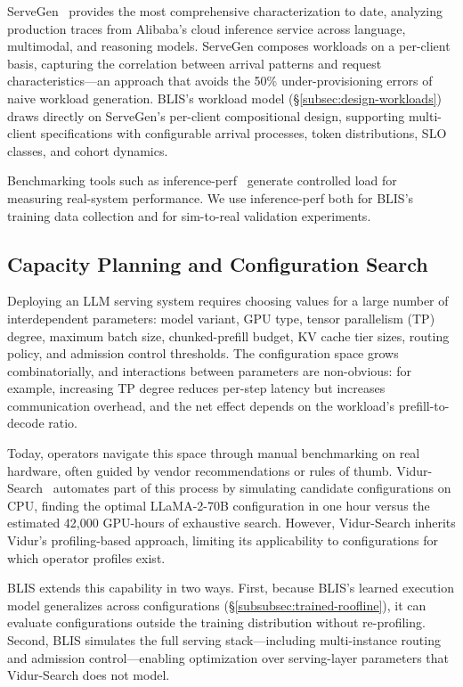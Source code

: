 \documentclass[11pt]{article}
\theoremstyle{plain} %
\theoremstyle{definition} %
\theoremstyle{remark} %
\numberwithin{equation}{section}
\begin{document}
ServeGen~\cite{xiang2025servegen} provides the most comprehensive characterization to date, analyzing production traces from Alibaba's cloud inference service across language, multimodal, and reasoning models.
ServeGen composes workloads on a per-client basis, capturing the correlation between arrival patterns and request characteristics---an approach that avoids the 50\% under-provisioning errors of naive workload generation.
BLIS's workload model (\S\ref{subsec:design-workloads}) draws directly on ServeGen's per-client compositional design, supporting multi-client specifications with configurable arrival processes, token distributions, SLO classes, and cohort dynamics.

Benchmarking tools such as inference-perf~\cite{inferenceperf2024} generate controlled load for measuring real-system performance.
We use inference-perf both for BLIS's training data collection and for sim-to-real validation experiments.

\subsection{Capacity Planning and Configuration Search}
\label{subsec:bg-capplan}

Deploying an LLM serving system requires choosing values for a large number of interdependent parameters: model variant, GPU type, tensor parallelism (TP) degree, maximum batch size, chunked-prefill budget, KV cache tier sizes, routing policy, and admission control thresholds.
The configuration space grows combinatorially, and interactions between parameters are non-obvious: for example, increasing TP degree reduces per-step latency but increases communication overhead, and the net effect depends on the workload's prefill-to-decode ratio.

Today, operators navigate this space through manual benchmarking on real hardware, often guided by vendor recommendations or rules of thumb.
Vidur-Search~\cite{agrawal2024vidur} automates part of this process by simulating candidate configurations on CPU, finding the optimal LLaMA-2-70B configuration in one hour versus the estimated 42{,}000 GPU-hours of exhaustive search.
However, Vidur-Search inherits Vidur's profiling-based approach, limiting its applicability to configurations for which operator profiles exist.

BLIS extends this capability in two ways.
First, because BLIS's learned execution model generalizes across configurations (\S\ref{subsubsec:trained-roofline}), it can evaluate configurations outside the training distribution without re-profiling.
Second, BLIS simulates the full serving stack---including multi-instance routing and admission control---enabling optimization over serving-layer parameters that Vidur-Search does not model.
\end{document}
